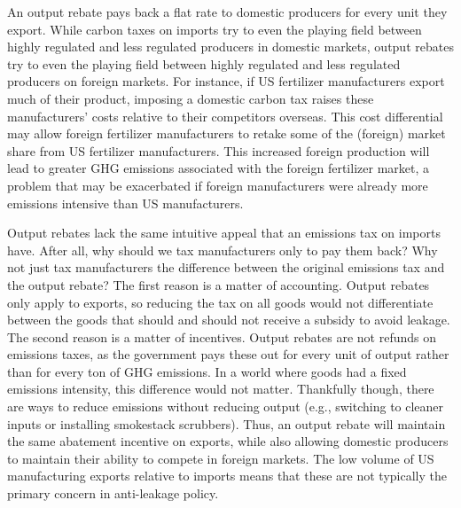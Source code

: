An output rebate pays back a flat rate to domestic producers for every unit they export. While carbon taxes on imports try to even the playing field between highly regulated and less regulated producers in domestic markets, output rebates try to even the playing field between highly regulated and less regulated producers on foreign markets. For instance, if US fertilizer manufacturers export much of their product, imposing a domestic carbon tax raises these manufacturers’ costs relative to their competitors overseas. This cost differential may allow foreign fertilizer manufacturers to retake some of the (foreign) market share from US fertilizer manufacturers. This increased foreign production will lead to greater GHG emissions associated with the foreign fertilizer market, a problem that may be exacerbated if foreign manufacturers were already more emissions intensive than US manufacturers.

Output rebates lack the same intuitive appeal that an emissions tax on imports have. After all, why should we tax manufacturers only to pay them back? Why not just tax manufacturers the difference between the original emissions tax and the output rebate? The first reason is a matter of accounting. Output rebates only apply to exports, so reducing the tax on all goods would not differentiate between the goods that should and should not receive a subsidy to avoid leakage. The second reason is a matter of incentives. Output rebates are not refunds on emissions taxes, as the government pays these out for every unit of output rather than for every ton of GHG emissions. In a world where goods had a fixed emissions intensity, this difference would not matter. Thankfully though, there are ways to reduce emissions without reducing output (e.g., switching to cleaner inputs or installing smokestack scrubbers). Thus, an output rebate will maintain the same abatement incentive on exports, while also allowing domestic producers to maintain their ability to compete in foreign markets. The low volume of US manufacturing exports relative to imports means that these are not typically the primary concern in anti-leakage policy.

